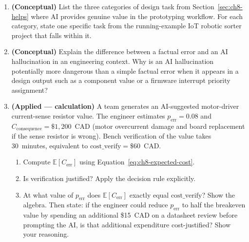 \begin{enumerate}

  \item \textbf{(Conceptual)} List the three categories of design task from
  Section~\ref{sec:ch8-helps} where AI provides genuine value in the
  prototyping workflow.
  For each category, state one specific task from the running-example IoT
  robotic sorter project that falls within it.

  \item \textbf{(Conceptual)} Explain the difference between a factual error
  and an AI hallucination in an engineering context.
  Why is an AI hallucination potentially more dangerous than a simple factual
  error when it appears in a design output such as a component value or a
  firmware interrupt priority assignment?

  \item \textbf{(Applied --- calculation)} A team generates an AI-suggested
  motor-driver current-sense resistor value.
  The engineer estimates $p_{\text{err}} = 0.08$ and
  $C_{\text{consequence}} = \$1{,}200$~CAD (motor overcurrent damage and board
  replacement if the sense resistor is wrong).
  Bench verification of the value takes 30~minutes, equivalent to
  $\text{cost\_verify} = \$60$~CAD.
  \begin{enumerate}
    \item[(a)] Compute $\mathbb{E}[C_{\text{err}}]$ using
               Equation~\ref{eq:ch8-expected-cost}.
    \item[(b)] Is verification justified? Apply the decision rule explicitly.
    \item[(c)] At what value of $p_{\text{err}}$ does $\mathbb{E}[C_{\text{err}}]$
               exactly equal $\text{cost\_verify}$?
               Show the algebra.
               Then state: if the engineer could reduce $p_{\text{err}}$ to
               half the breakeven value by spending an additional \$15~CAD on
               a datasheet review before prompting the AI, is that additional
               expenditure cost-justified? Show your reasoning.
  \end{enumerate}


\end{enumerate}
